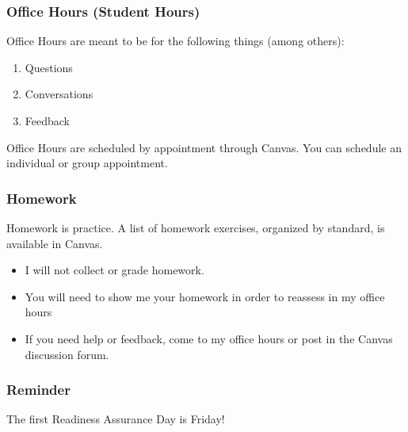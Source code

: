 \documentclass[aspectration=1610]{beamer}
\begin{document}
\begin{frame}\frametitle{Office Hours (Student Hours)}
Office Hours are meant to be for the following things (among others):
\begin{enumerate}
\item Questions
\item Conversations
\item Feedback
\end{enumerate}

\vspace{0.2in}

Office Hours are scheduled by appointment through Canvas. You can schedule an individual or group appointment.
\end{frame}



\begin{frame}\frametitle{Homework}
Homework is practice.  A list of homework exercises, organized by standard, is available in Canvas.
\begin{itemize}
\item I will not collect or grade homework.
\item You will need to show me your homework in order to reassess in my office hours
\item If you need help or feedback, come to my office hours or post in the Canvas discussion forum.
\end{itemize}
\end{frame}


\begin{frame}\frametitle{Reminder}
The first Readiness Assurance Day is Friday!
\end{frame}
\end{document}
